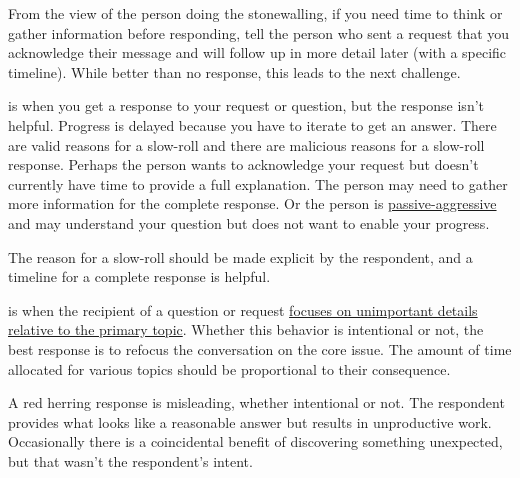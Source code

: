 From the view of the person doing the stonewalling, if you need time to think or gather information before responding, 
%
%
tell the person who sent a request that you acknowledge their message and will follow up in more detail later (with a specific timeline). While better than no response, this leads to the next challenge.

\iftoggle{glossaryinmargin}{\marginpar{[Glossary]}}{}
\iftoggle{glossarysubstitutionworks}{\Gls{slow-rolling}}{Slow-rolling} 
is when you get a response to your request or question, but the response isn't helpful. Progress is delayed because you have to iterate to get an answer. There are valid reasons for a slow-roll and there are malicious reasons for a slow-roll response. Perhaps the person wants to acknowledge your request but doesn't currently have time to provide a full explanation. The person may need to gather more information for the complete response. Or the person is \href{https://en.wikipedia.org/wiki/Passive-aggressive_behavior}{passive-aggressive}
\iftoggle{WPinmargin}{\marginpar{$>$Wikipedia: Passive-aggressive behavior}}{}%
and may understand your question but does not want to enable your progress. 

The reason for a slow-roll should be made explicit by the respondent, 
%
%
and a timeline for a complete response is helpful. 


\label{concept:bikeshedding}
\iftoggle{glossaryinmargin}{\marginpar{[Glossary]}}{}
\iftoggle{glossarysubstitutionworks}{\Gls{bikeshedding}}{Bikeshedding} 
is when the recipient of a question or request 
\href{https://en.wikipedia.org/wiki/Law_of_triviality}{focuses on unimportant details relative to the primary topic}. 
\iftoggle{WPinmargin}{\marginpar{$>$Wikipedia: Law of Triviality]}}{}%
Whether this behavior is intentional or not, the best response is to refocus the conversation on the core issue. The amount of time allocated for various topics should be proportional to their consequence. 

A \gls{red herring}\iftoggle{glossaryinmargin}{\marginpar{[Glossary]}}{}
response is misleading, whether intentional or not. The respondent provides what looks like a reasonable answer but results in unproductive work. Occasionally there is a coincidental benefit of discovering something unexpected, but that wasn't the respondent's intent. 


